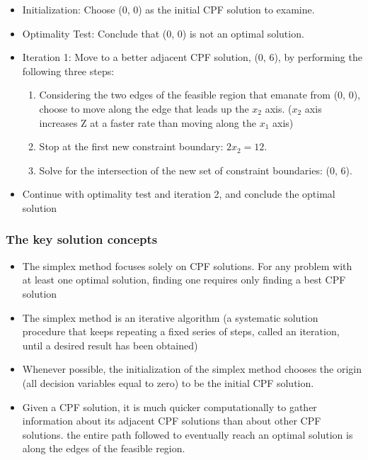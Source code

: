 \documentclass[12pt]{article}
\begin{document}
  \begin{itemize}
  \item Initialization: Choose (0, 0) as the initial CPF solution to examine. 
  \item Optimality Test: Conclude that (0, 0) is not an optimal solution. 
  \item Iteration 1: Move to a better adjacent CPF solution, (0, 6), by performing the following three steps:
    \begin{enumerate}
    \item Considering the two edges of the feasible region that emanate from (0, 0), choose to move
along the edge that leads up the $x_2$ axis. ($x_2$ axis increases Z at a faster rate than moving along the $x_1$ axis)
\item Stop at the first new constraint boundary: $2x_2 = 12$. 
\item Solve for the intersection of the new set of constraint boundaries: (0, 6). 
    \end{enumerate}
\item Continue with optimality test and iteration 2, and conclude the optimal solution
  \end{itemize}



\subsubsection*{The key solution concepts}
\begin{itemize}
\item The simplex method focuses solely on CPF solutions. For
any problem with at least one optimal solution, finding one requires only finding a best CPF solution
\item The simplex method is an iterative algorithm (a systematic
solution procedure that keeps repeating a fixed series of steps, called an iteration,
until a desired result has been obtained) 
\item Whenever possible, the initialization of the simplex method
chooses the origin (all decision variables equal to zero) to be the initial CPF solution. 
\item Given a CPF solution, it is much quicker computationally
to gather information about its adjacent CPF solutions than about other CPF solutions. 
the entire path followed to eventually reach an optimal solution is along
the edges of the feasible region.
\end{itemize}
\end{document}
